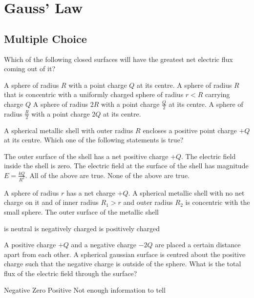 \section{Gauss' Law}

\subsection{Multiple Choice}


\question Which of the following closed surfaces will have the greatest net electric flux coming out of it?
\begin{checkboxes}
\choice A sphere of radius $R$ with a point charge $Q$ at its centre.
\choice A sphere of radius $R$ that is concentric with a uniformly charged sphere of radius $r<R$ carrying charge $Q$
\choice A sphere of radius $2R$ with a point charge $\frac{Q}{2}$ at its centre.
\CorrectChoice A sphere of radius $\frac{R}{2}$ with a point charge $2Q$ at its centre. \correct
\end{checkboxes}

\question A spherical metallic shell with outer radius $R$ encloses a positive point charge $+Q$ at its centre. Which one of the following statements is true?
\begin{choices}
	\choice The outer surface of the shell has a net positive charge $+Q$.
	\choice The electric field inside the shell is zero.
	\choice The electric field at the surface of the shell has magnitude $E=\frac{kQ}{R^2}$.
	\CorrectChoice All of the above are true.
	\choice None of the above are true.
\end{choices}

\question A sphere of radius $r$ has a net charge $+Q$. A spherical metallic shell with no net charge on it and of inner radius $R_1>r$ and outer radius $R_2$ is concentric with the small sphere. The outer surface of the metallic shell
\begin{checkboxes}
\choice is neutral
\choice is negatively charged
\CorrectChoice is positively charged \correct
\end{checkboxes}

\question A positive charge $+Q$ and a negative charge $-2Q$ are placed a certain distance apart from each other. A spherical gaussian surface is centred about the positive charge such that the negative charge is outside of the sphere. What is the total flux of the electric field through the surface?
\begin{checkboxes}
	\choice Negative
	\choice Zero
	\CorrectChoice Positive
	\choice Not enough information to tell
\end{checkboxes}


